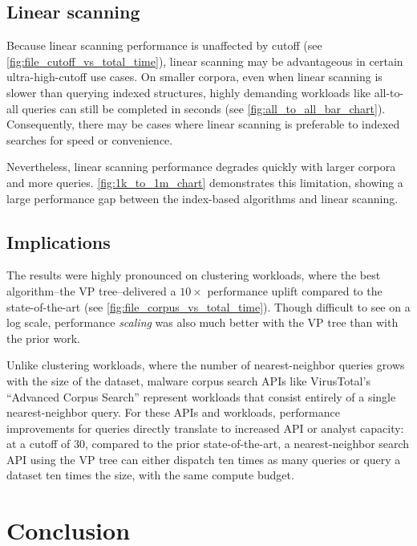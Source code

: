 \documentclass[5p,final]{elsarticle}
\begin{document}
\subsection{Linear scanning}

Because linear scanning performance is unaffected by cutoff (see
\autoref{fig:file_cutoff_vs_total_time}), linear scanning may be
advantageous in certain ultra-high-cutoff use cases. On smaller
corpora, even when linear scanning is slower than querying indexed
structures, highly demanding workloads like all-to-all queries can
still be completed in seconds (see
\autoref{fig:all_to_all_bar_chart}). Consequently, there may be cases
where linear scanning is preferable to indexed searches for speed or
convenience.

Nevertheless, linear scanning performance degrades quickly with
larger corpora and more queries. \autoref{fig:1k_to_1m_chart}
demonstrates this limitation, showing a large performance gap between
the index-based algorithms and linear scanning.

\subsection{Implications}

The results were highly pronounced on clustering workloads, where the
best algorithm--the VP tree--delivered a $10\times$ performance uplift
compared to the state-of-the-art
(see \autoref{fig:file_corpus_vs_total_time}).
Though difficult to see on a log scale, performance \textit{scaling}
was also much better with the VP tree than with the prior work.

Unlike clustering workloads, where the number of nearest-neighbor
queries grows with the size of the dataset, malware corpus search
APIs like VirusTotal's \enquote{Advanced Corpus Search}
\cite{virustotalAdvancedCorpusSearch2024} represent workloads that
consist entirely of a single nearest-neighbor query. For these APIs
and workloads, performance improvements for queries directly
translate to increased API or analyst capacity: at a cutoff of 30,
compared to the prior state-of-the-art, a nearest-neighbor search API
using the VP tree can either dispatch ten times as many queries or
query a dataset ten times the size, with the same compute budget.

\section{Conclusion}
\end{document}
